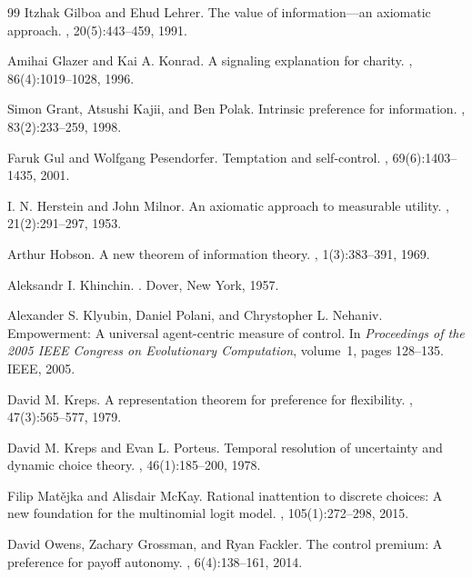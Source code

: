 \documentclass[11pt,a4paper]{article}
\theoremstyle{definition}
\newcommand{\1}{\mathbf 1}
\begin{document}
\begin{thebibliography}{99}
Itzhak Gilboa and Ehud Lehrer.
\newblock The value of information---an axiomatic approach.
, 20(5):443--459, 1991.

Amihai Glazer and Kai A. Konrad.
\newblock A signaling explanation for charity.
, 86(4):1019--1028, 1996.

Simon Grant, Atsushi Kajii, and Ben Polak.
\newblock Intrinsic preference for information.
, 83(2):233--259, 1998.

Faruk Gul and Wolfgang Pesendorfer.
\newblock Temptation and self-control.
, 69(6):1403--1435, 2001.

I. N. Herstein and John Milnor.
\newblock An axiomatic approach to measurable utility.
, 21(2):291--297, 1953.

Arthur Hobson.
\newblock A new theorem of information theory.
, 1(3):383--391, 1969.

Aleksandr I. Khinchin.
.
\newblock Dover, New York, 1957.

Alexander S. Klyubin, Daniel Polani, and Chrystopher L. Nehaniv.
\newblock Empowerment: A universal agent-centric measure of control.
\newblock In {\em Proceedings of the 2005 IEEE Congress on Evolutionary Computation}, volume~1, pages 128--135. IEEE,
  2005.

David M. Kreps.
\newblock A representation theorem for preference for flexibility.
, 47(3):565--577, 1979.

David M. Kreps and Evan L. Porteus.
\newblock Temporal resolution of uncertainty and dynamic choice theory.
, 46(1):185--200, 1978.

Filip Mat\v{e}jka and Alisdair McKay.
\newblock Rational inattention to discrete choices: A new foundation for the multinomial logit model.
, 105(1):272--298, 2015.

David Owens, Zachary Grossman, and Ryan Fackler.
\newblock The control premium: A preference for payoff autonomy.
, 6(4):138--161, 2014.


\end{thebibliography}
\end{document}
